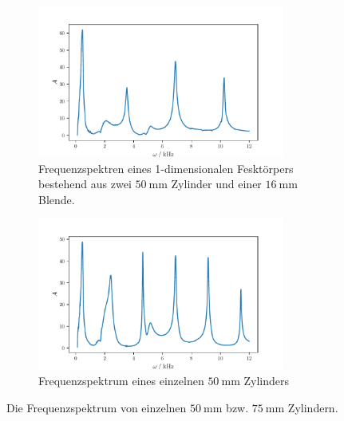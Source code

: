 \begin{figure}
    \begin{subfigure}{0.48\textwidth}%
        \centering%
        \includegraphics[height=5cm]{build/50single.pdf}%
        \caption{Frequenzspektren eines 1-dimensionalen Fesktörpers bestehend aus zwei $\qty{50}{\milli\meter}$ Zylinder und einer $\qty{16}{\milli\meter}$ Blende.}%
        \label{fig:50sinlge}%
    \end{subfigure}%
    \hfill%
    \begin{subfigure}{0.48\textwidth}%
        \centering%
        \includegraphics[height=5cm]{build/75single.pdf}%
        \caption{Frequenzspektrum eines einzelnen $\qty{50}{\milli\meter}$ Zylinders}%
        \label{fig:75single}%
    \end{subfigure}%
    \caption{Die Frequenzspektrum von einzelnen $\qty{50}{\milli\meter}$ bzw. $\qty{75}{\milli\meter}$ Zylindern.}%
    \label{fig:75and50single}
\end{figure}%